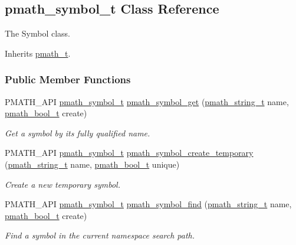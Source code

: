 \hypertarget{classpmath__symbol__t}{
\subsection{pmath\_\-symbol\_\-t Class Reference}
\label{classpmath__symbol__t}
}
The Symbol class.  


Inherits \hyperlink{classpmath__t}{pmath\_\-t}.

\subsubsection*{Public Member Functions}
\begin{CompactItemize}
\item 
PMATH\_\-API \hyperlink{classpmath__symbol__t}{pmath\_\-symbol\_\-t} \hyperlink{group__symbols_g0ccb42b30fcf6ee77d91241222f5c033}{pmath\_\-symbol\_\-get} (\hyperlink{classpmath__string__t}{pmath\_\-string\_\-t} name, \hyperlink{group__general__types_gc92090cb0b56345d6c379ed2341d4ef4}{pmath\_\-bool\_\-t} create)
\begin{CompactList}\small\item\em Get a symbol by its fully qualified name. \item\end{CompactList}\item 
PMATH\_\-API \hyperlink{classpmath__symbol__t}{pmath\_\-symbol\_\-t} \hyperlink{group__symbols_g6f088bc8c667dfe91087dc4ace6d18c1}{pmath\_\-symbol\_\-create\_\-temporary} (\hyperlink{classpmath__string__t}{pmath\_\-string\_\-t} name, \hyperlink{group__general__types_gc92090cb0b56345d6c379ed2341d4ef4}{pmath\_\-bool\_\-t} unique)
\begin{CompactList}\small\item\em Create a new temporary symbol. \item\end{CompactList}\item 
PMATH\_\-API \hyperlink{classpmath__symbol__t}{pmath\_\-symbol\_\-t} \hyperlink{group__symbols_g597a971f788584cac3f327f1afdd5f41}{pmath\_\-symbol\_\-find} (\hyperlink{classpmath__string__t}{pmath\_\-string\_\-t} name, \hyperlink{group__general__types_gc92090cb0b56345d6c379ed2341d4ef4}{pmath\_\-bool\_\-t} create)
\begin{CompactList}\small\item\em Find a symbol in the current namespace search path. \item\end{CompactList}\item 

\end{CompactItemize}
